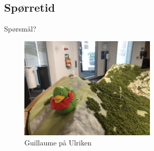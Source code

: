 \subsection*{Spørretid}
\begin{frame}{Spørsmål?}
    \begin{figure}
        \centering
        \includegraphics[height = 4.9cm]{images/guillaume11.jpg}
        \caption{Guillaume på Ulriken}
        \label{fig:guillaume11}
    \end{figure}
\end{frame}